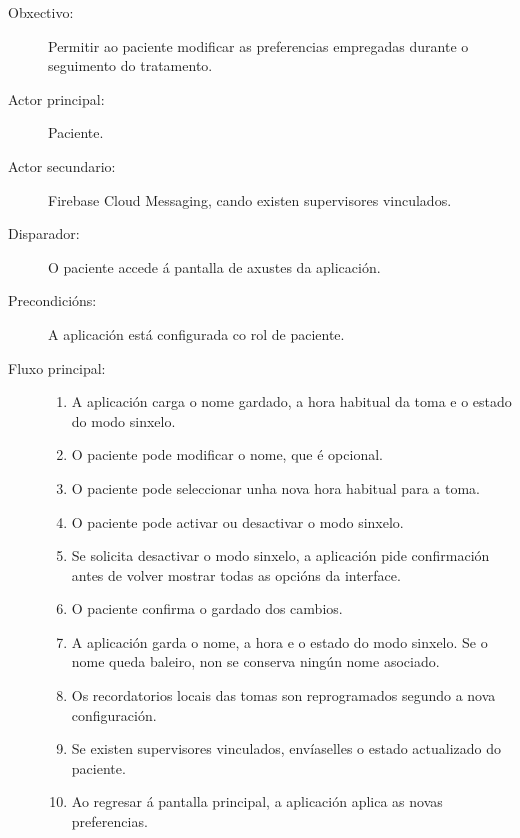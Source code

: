 \begin{description}

\item[Obxectivo:] Permitir ao paciente modificar as preferencias empregadas
durante o seguimento do tratamento.

\item[Actor principal:] Paciente.

\item[Actor secundario:] Firebase Cloud Messaging, cando existen supervisores
vinculados.

\item[Disparador:] O paciente accede á pantalla de axustes da aplicación.

\item[Precondicións:] A aplicación está configurada co rol de paciente.

\item[Fluxo principal:] \hfill
\begin{enumerate}
    \item A aplicación carga o nome gardado, a hora habitual da toma e o estado
    do modo sinxelo.

    \item O paciente pode modificar o nome, que é opcional.

    \item O paciente pode seleccionar unha nova hora habitual para a toma.

    \item O paciente pode activar ou desactivar o modo sinxelo.

    \item Se solicita desactivar o modo sinxelo, a aplicación pide confirmación
    antes de volver mostrar todas as opcións da interface.

    \item O paciente confirma o gardado dos cambios.

    \item A aplicación garda o nome, a hora e o estado do modo sinxelo. Se o nome
    queda baleiro, non se conserva ningún nome asociado.

    \item Os recordatorios locais das tomas son reprogramados segundo a nova
    configuración.

    \item Se existen supervisores vinculados, envíaselles o estado actualizado
    do paciente.

    \item Ao regresar á pantalla principal, a aplicación aplica as novas
    preferencias.
\end{enumerate}


\end{description}
